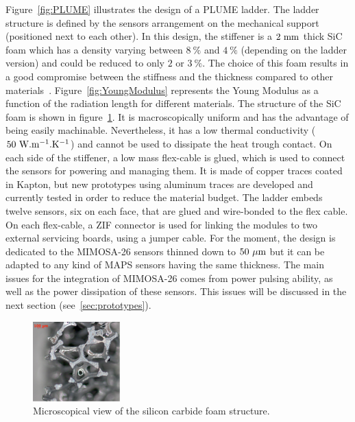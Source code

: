     Figure~\ref{fig:PLUME} illustrates the design of a PLUME ladder.
    The ladder structure is defined by the sensors arrangement on the mechanical support (positioned next to each other).
    In this design, the stiffener is a $2~\rm{mm}$ thick \gls{SiC} foam which has a density varying between $8~\%$ and $4~\%$ (depending on the ladder version) and could be reduced to only $2$ or $3~\%$.
    The choice of this foam results in a good compromise between the stiffness and the thickness compared to other materials~\cite{LectureJoel}.
    Figure~\ref{fig:YoungModulus} represents the Young Modulus as a function of the radiation length for different materials.
    The structure of the \gls{SiC} foam is shown in figure~\ref{fig:SiC}.
    It is macroscopically uniform and has the advantage of being easily machinable.
    Nevertheless, it has a low thermal conductivity ($50~\rm{W.m^{-1}.K^{-1}}$) and cannot be used to dissipate the heat trough contact.
    On each side of the stiffener, a low mass flex-cable is glued, which is used to connect the sensors for powering and managing them.
    It is made of copper traces coated in Kapton, but new prototypes using aluminum traces are developed and currently tested in order to reduce the material budget.
    The ladder embeds twelve sensors, six on each face, that are glued and wire-bonded to the flex cable.
    On each flex-cable, a \gls{ZIF} connector is used for linking the modules to two external servicing boards, using a jumper cable.
    For the moment, the design is dedicated to the \gls{MIMOSA}-26 sensors thinned down to $50~\rm{\mu m}$ but it can be adapted to any kind of \gls{MAPS} sensors having the same thickness. 
    The main issues for the integration of \gls{MIMOSA}-26 comes from power pulsing ability, as well as the power dissipation of these sensors.
    This issues will be discussed in the next section (see~\ref{sec:prototypes}).

    \begin{figure}[!tbh]
      \centering
      \includegraphics[width=0.3\textwidth]{Pictures/vxd/foam2.png}
      \caption{Microscopical view of the silicon carbide foam structure.}
      \label{fig:SiC}
    \end{figure}

